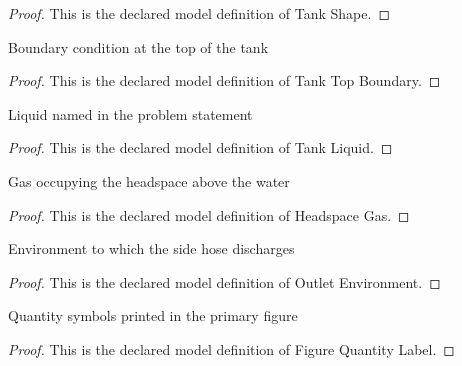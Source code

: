 \begin{proof}
  This is the declared model definition of Tank Shape.
\end{proof}
\begin{definition}
  \label{def:physics:phyx-mini-0334:phyxminiproblems-problemphyxmini0334-tanktopboundary}
  Boundary condition at the top of the tank
\end{definition}
\begin{proof}
  This is the declared model definition of Tank Top Boundary.
\end{proof}
\begin{definition}
  \label{def:physics:phyx-mini-0334:phyxminiproblems-problemphyxmini0334-tankliquid}
  Liquid named in the problem statement
\end{definition}
\begin{proof}
  This is the declared model definition of Tank Liquid.
\end{proof}
\begin{definition}
  \label{def:physics:phyx-mini-0334:phyxminiproblems-problemphyxmini0334-headspacegas}
  Gas occupying the headspace above the water
\end{definition}
\begin{proof}
  This is the declared model definition of Headspace Gas.
\end{proof}
\begin{definition}
  \label{def:physics:phyx-mini-0334:phyxminiproblems-problemphyxmini0334-outletenvironment}
  Environment to which the side hose discharges
\end{definition}
\begin{proof}
  This is the declared model definition of Outlet Environment.
\end{proof}
\begin{definition}
  \label{def:physics:phyx-mini-0334:phyxminiproblems-problemphyxmini0334-figurequantitylabel}
  Quantity symbols printed in the primary figure
\end{definition}
\begin{proof}
  This is the declared model definition of Figure Quantity Label.
\end{proof}
